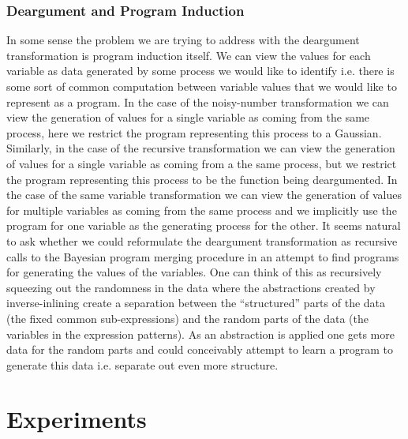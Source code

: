 \documentclass[a4paper,10pt]{article}
\begin{document}
\subsubsection{Deargument and Program Induction}
In some sense the problem we are trying to address with the deargument transformation is program induction itself.  We can view the values for each variable as data generated by some process we would like to identify i.e. there is some sort of common computation between variable values that we would like to represent as a program.  In the case of the noisy-number transformation we can view the generation of values for a single variable as coming from the same process, here we restrict the program representing this process to a Gaussian.  Similarly, in the case of the recursive transformation we can view the generation of values for a single variable as coming from a the same process, but we restrict the program representing this process to be the function being deargumented.  In the case of the same variable transformation we can view the generation of values for multiple variables as coming from the same process and we implicitly use the program for one variable as the generating process for the other.  It seems natural to ask whether we could reformulate the deargument transformation as recursive calls to the Bayesian program merging procedure in an attempt to find programs for generating the values of the variables.  One can think of this as recursively squeezing out the randomness in the data where the abstractions created by inverse-inlining create a separation between the ``structured'' parts of the data (the fixed common sub-expressions) and the random parts of the data (the variables in the expression patterns).  As an abstraction is applied one gets more data for the random parts and could conceivably attempt to learn a program to generate this data i.e. separate out even more structure.
\section{Experiments}
\end{document}

